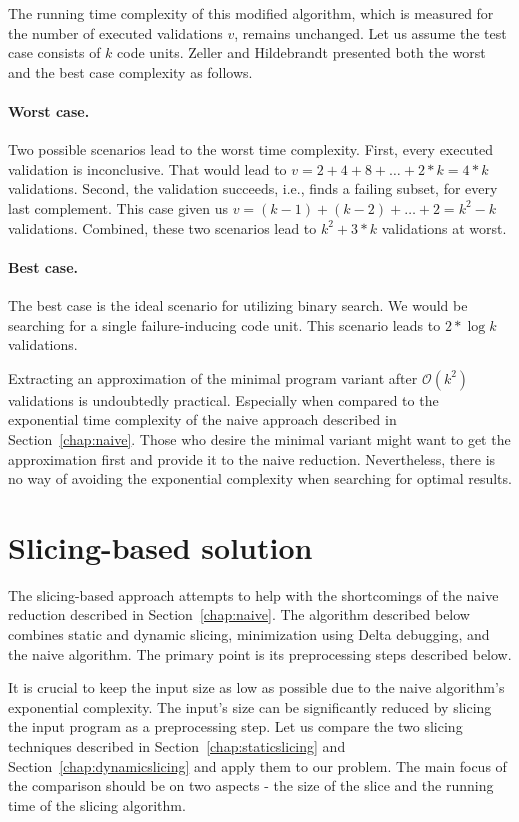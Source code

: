 The running time complexity of this modified algorithm, which is measured 
for the number of executed validations $v$, remains unchanged. 
Let us assume the test case consists of $k$ code units. 
Zeller and Hildebrandt\citep*{Zeller02} presented both the worst 
and the best case complexity as follows.

\paragraph{Worst case.} Two possible scenarios lead to the worst time 
complexity. 
First, every executed validation is inconclusive. 
That would lead to $v = 2 + 4 + 8 + \ldots + 2 * k = 4 * k$ validations. 
Second, the validation succeeds, i.e., finds a failing subset, for every 
last complement. 
This case given us $v = (k - 1) + (k - 2) + \ldots + 2 = k^2 - k$ validations.
Combined, these two scenarios lead to $k^2 + 3 * k$ validations at worst.

\paragraph{Best case.} The best case is the ideal scenario for utilizing 
binary search. 
We would be searching for a single failure-inducing code unit. 
This scenario leads to $2 * \log{}k$ validations.

Extracting an approximation of the minimal program variant after 
$\mathcal{O}(k^2)$ validations is undoubtedly practical. 
Especially when compared to the exponential time complexity of the naive 
approach described in Section~\ref{chap:naive}. 
Those who desire the minimal variant might want to get the approximation 
first and provide it to the naive reduction. 
Nevertheless, there is no way of avoiding the exponential complexity when 
searching for optimal results.

\section{Slicing-based solution}\label{chap:systematic}

The slicing-based approach attempts to help with the shortcomings of 
the naive reduction described in Section~\ref{chap:naive}.
The algorithm described below combines static and dynamic slicing, 
minimization using Delta debugging, and the naive algorithm. 
The primary point is its preprocessing steps described below. 

It is crucial to keep the input size as low as possible due to the naive 
algorithm's exponential complexity.  
The input's size can be significantly reduced by slicing the input program 
as a preprocessing step.  
Let us compare the two slicing techniques described 
in Section~\ref{chap:staticslicing} and Section~\ref{chap:dynamicslicing} and 
apply them to our problem. 
The main focus of the comparison should be on two aspects - the size of 
the slice and the running time of the slicing algorithm. 

